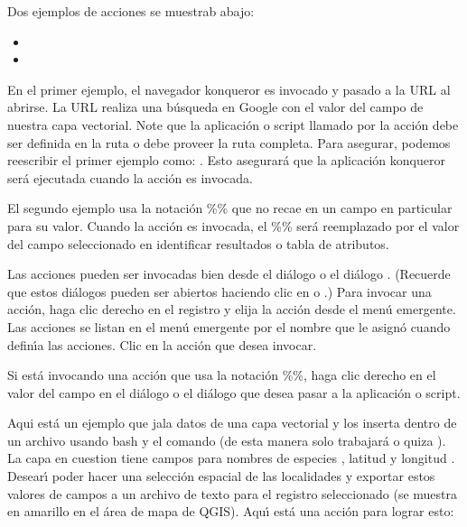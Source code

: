 Dos ejemplos de acciones se muestrab abajo:

\begin{itemize}
  \item {}
  \item {}
\end{itemize}

En el primer ejemplo, el navegador konqueror es invocado y pasado a la URL al 
abrirse. La URL realiza una b\'usqueda en Google con el valor del campo 
de nuestra capa vectorial. Note que la aplicaci\'on o script llamado por la acci\'on
debe ser definida en la ruta o debe proveer la  ruta completa. Para asegurar, podemos
reescribir el primer ejemplo como: . Esto asegurar\'a que la aplicaci\'on konqueror
ser\'a ejecutada cuando la acci\'on es invocada.

El segundo ejemplo usa la notaci\'on \%\% que no recae en un campo en particular
para su valor. Cuando la acci\'on es invocada, el \%\% ser\'a reemplazado por
el valor del campo seleccionado en identificar resultados o tabla de atributos.

\label{label_usingactions}
Las acciones pueden ser invocadas bien desde el di\'alogo  o el 
 di\'alogo . 
(Recuerde que estos di\'alogos pueden ser abiertos haciendo clic en
o
.)
Para invocar una acci\'on, 
haga clic derecho en el registro
y elija la acci\'on desde el men\'u emergente. Las acciones se listan en el men\'u
emergente por el nombre que le asign\'o cuando defin\'{\i}a las acciones. Clic en la acci\'on
que desea invocar.

Si est\'a invocando una acci\'on que usa la notaci\'on \%\%, haga clic derecho en el
valor del campo en el di\'alogo  o el
 di\'alogo que desea pasar a la aplicaci\'on o script.

Aqui est\'a un ejemplo que jala datos de una capa vectorial y los inserta
dentro de un archivo usando bash y el comando  (de esta manera solo trabajar\'a
\nix o quiza \osx). La capa en cuestion tiene campos para nombres de especies
, latitud  y longitud
. Desear\'{\i} poder hacer
una selecci\'on espacial de las localidades y exportar estos valores de campos a
un archivo de texto para el registro seleccionado (se muestra en amarillo en el \'area de mapa de QGIS). Aqu\'{\i} est\'a
una acci\'on para lograr esto:

